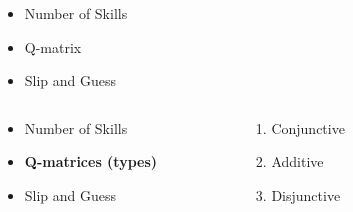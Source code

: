 \documentclass{beamer}
\begin{document}
\begin{frame}
\begin{overprint}
\begin{columns}
\begin{column}{0.7\textwidth}
	      \end{column}
	     \end{columns}
		\begin{columns}
		\begin{column}{0.35\textwidth}
      		\begin{itemize}
      			\item Number of Skills
      			\item Q-matrix 
      			\item Slip and Guess
	      	\end{itemize}
	      \end{column}
	      \begin{column}{0.7\textwidth}
	      \end{column}
	     \end{columns}
	     \onslide<4>
	     		\begin{columns}
		\begin{column}{0.4\textwidth}
      		\begin{itemize}
      		      		   	\vspace{-0.5cm}
      			\item Number of Skills
      			\item \textbf{Q-matrices (types)}%
      			\item Slip and Guess
	      	\end{itemize}
	      \end{column}
	      \begin{column}{0.25\textwidth}
	      \begin{enumerate}
	      \item Conjunctive
	      \item Additive 
	      \item Disjunctive
	      \end{enumerate}
	      \end{column}
	      \begin{column}{0.4\textwidth}
	      
	      \resizebox{0.66\columnwidth}{1.2cm}{

}
\end{column}
\end{columns}
\end{overprint}
\end{frame}
\end{document}
